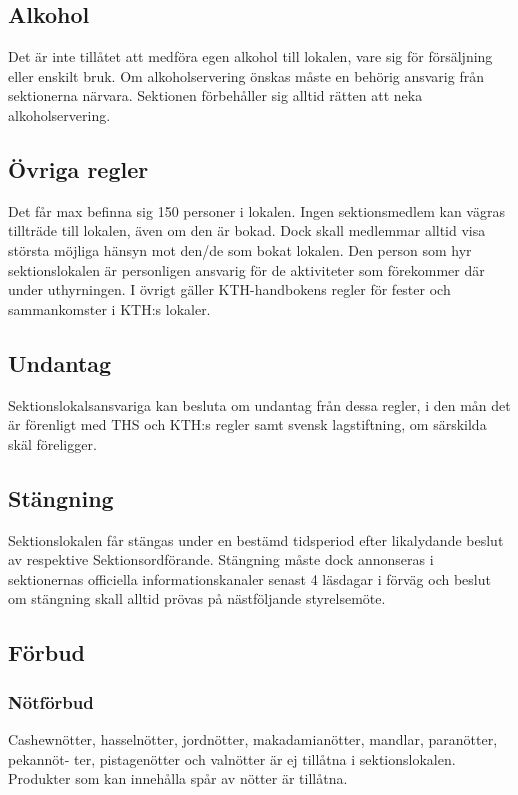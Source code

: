 \documentclass{dgovdoc}
\begin{document}
\subsection{Alkohol}

Det är inte tillåtet att medföra egen alkohol till lokalen, vare sig för
försäljning eller enskilt bruk. Om alkoholservering önskas måste en behörig
ansvarig från sektionerna närvara. Sektionen förbehåller sig alltid rätten att
neka alkoholservering.

\subsection{Övriga regler}

Det får max befinna sig 150 personer i lokalen. Ingen sektionsmedlem kan vägras
tillträde till lokalen, även om den är bokad. Dock skall medlemmar alltid visa
största möjliga hänsyn mot den/de som bokat lokalen. Den person som hyr
sektionslokalen är personligen ansvarig för de aktiviteter som förekommer där
under uthyrningen. I övrigt gäller KTH-handbokens regler för fester och
sammankomster i KTH:s lokaler.

\subsection{Undantag}

Sektionslokalsansvariga kan besluta om undantag från dessa regler, i den mån
det är förenligt med THS och KTH:s regler samt svensk lagstiftning, om
särskilda skäl föreligger.

\subsection{Stängning}
\label{sec:sektionslokal-stangning}

Sektionslokalen får stängas under en bestämd tidsperiod efter likalydande
beslut av respektive Sektionsordförande. Stängning måste dock annonseras i
sektionernas officiella informationskanaler senast 4 läsdagar i förväg och
beslut om stängning skall alltid prövas på nästföljande styrelsemöte.

\subsection{Förbud}

\subsubsection{Nötförbud}
Cashewnötter, hasselnötter, jordnötter, makadamianötter, mandlar, paranötter, pekannöt-
ter, pistagenötter och valnötter är ej tillåtna i sektionslokalen. Produkter som kan innehålla
spår av nötter är tillåtna.
\end{document}
